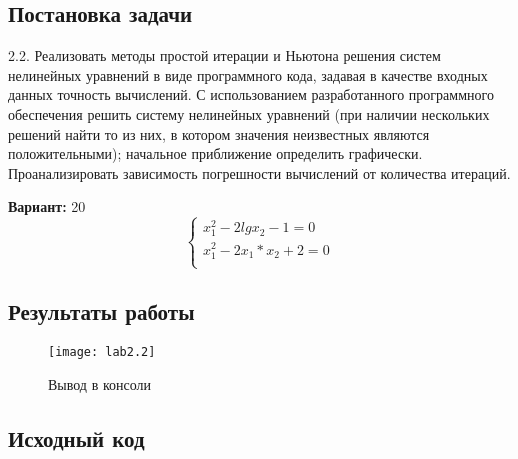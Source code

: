 \subsection{Постановка задачи}
2.2. Реализовать методы простой итерации и Ньютона решения систем нелинейных уравнений в виде программного кода, задавая в качестве входных данных точность вычислений. С использованием разработанного программного обеспечения решить систему нелинейных уравнений (при наличии нескольких решений найти то из них, в котором значения неизвестных являются положительными); начальное приближение определить графически. Проанализировать зависимость погрешности вычислений от количества итераций. 

{\bfseries Вариант:} 20
    \begin{equation}
        \left\{ 
        \begin{array}{ll} 
        x^2_1 - 2lgx_2-1=0\\
        x^2_1-2x_1*x_2 + 2 = 0\\
        \end{array}\right.
    \end{equation}
\pagebreak

\subsection{Результаты работы}
\begin{figure}[h!]
\centering
\texttt{[image: lab2.2]}
\caption{Вывод в консоли}
\end{figure}


\subsection{Исходный код}

\pagebreak